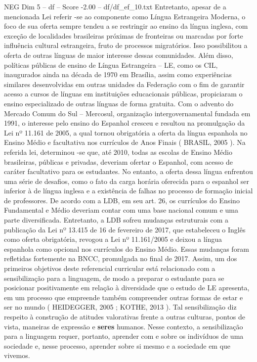 \begin{textsample}{NEG Dim 5 – df – Score -2.00 – df/df\_ef\_10.txt}
Entretanto, apesar de a mencionada Lei referir -se ao componente como Língua Estrangeira Moderna, o foco de sua oferta sempre tendeu a se restringir ao ensino da língua inglesa, com exceção de localidades brasileiras próximas de fronteiras ou marcadas por forte influência cultural estrangeira, fruto de processos migratórios.
Isso possibilitou a oferta de outras línguas de maior interesse dessas comunidades.
Além disso, políticas públicas de ensino de Língua Estrangeira – LE, como os CIL, inaugurados ainda na década de 1970 em Brasília, assim como experiências similares desenvolvidas em outras unidades da Federação com o fim de garantir acesso a cursos de línguas em instituições educacionais públicas, propiciaram o ensino especializado de outras línguas de forma gratuita.
Com o advento do Mercado Comum do Sul – Mercosul, organização intergovernamental fundada em 1991, o interesse pelo ensino do Espanhol cresceu e resultou na promulgação da Lei nº 11.161 de 2005, a qual tornou obrigatória a oferta da língua espanhola no Ensino Médio e facultativa nos currículos de Anos Finais ( BRASIL, 2005 ).
Na referida lei, determinou -se que, até 2010, todas as escolas de Ensino Médio brasileiras, públicas e privadas, deveriam ofertar o Espanhol, com acesso de caráter facultativo para os estudantes.
No entanto, a oferta dessa língua enfrentou uma série de desafios, como o fato da carga horária oferecida para o espanhol ser inferior à de língua inglesa e a existência de falhas no processo de formação inicial de professores.
De acordo com a LDB, em seu art. 26, os currículos do Ensino Fundamental e Médio deveriam contar com uma base nacional comum e uma parte diversificada.
Entretanto, a LDB sofreu mudanças estruturais com a publicação da Lei nº 13.415 de 16 de fevereiro de 2017, que estabeleceu o Inglês como oferta obrigatória, revogou a Lei nº 11.161/2005 e deixou a língua espanhola como opcional nos currículos do Ensino Médio.
Essas mudanças foram refletidas fortemente na BNCC, promulgada no final de 2017.
Assim, um dos primeiros objetivos deste referencial curricular está relacionado com a sensibilização para a linguagem, de modo a preparar o estudante para se posicionar positivamente em relação à diversidade que o estudo de LE apresenta, em um processo que empreende também compreender outras formas de estar e ser no mundo ( HEIDEGGER, 2005 ; KOTHE, 2013 ).
Tal sensibilização diz respeito à construção de atitudes valorativas frente a outras culturas, pontos de vista, maneiras de expressão e \textbf{seres} humanos.
Nesse contexto, a sensibilização para a linguagem requer, portanto, aprender com e sobre os indivíduos de uma sociedade e, nesse processo, aprender sobre si mesmo e a sociedade em que vivemos.

\end{textsample}
